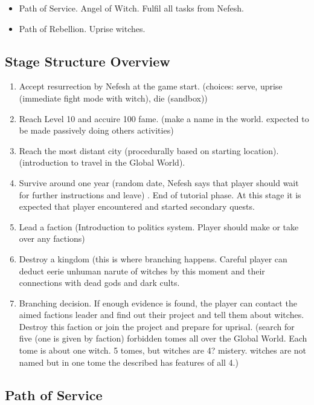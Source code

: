 \begin{itemize}
\item Path of Service. Angel of Witch. Fulfil all tasks from Nefesh.
\item Path of Rebellion. Uprise witches. 
\end{itemize}



\subsection{Stage Structure Overview}

\begin{enumerate}
\item Accept resurrection by Nefesh at the game start. (choices: serve, uprise (immediate fight mode with witch), die (sandbox))
\item Reach Level 10 and accuire 100 fame. (make a name in the world. expected to be made passively doing others activities)
\item Reach the most distant city (procedurally based on starting location). (introduction to travel in the Global World).
\item Survive around one year (random date, Nefesh says that player should wait for further instructions and leave) . End of tutorial phase. At this stage it is expected that player encountered and started secondary quests.
\item Lead a faction (Introduction to politics system. Player should make or take over any factions)
\item Destroy a kingdom (this is where branching happens. Careful player can deduct eerie unhuman narute of witches by this moment and their connections with dead gods and dark cults.
\item Branching decision. If enough evidence is found, the player can contact the aimed factions leader and find out their project and tell them about witches.
Destroy this faction or join the project and prepare for uprisal. (search for five (one is given by faction) forbidden tomes all over the Global World. Each tome is about one witch. 5 tomes, but witches are 4? mistery. witches are not named but in one tome the described has features of all 4.)
\end{enumerate}



\subsection{Path of Service}

